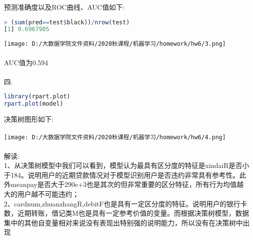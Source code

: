 \documentclass[]{article}
\begin{document}
预测准确度以及ROC曲线、AUC值如下:
\begin{lstlisting}[language=R]
> (sum(pred==test$black))/nrow(test)
[1] 0.6967905
\end{lstlisting}
\texttt{[image: D:/大数据学院文件资料/2020秋课程/机器学习/homework/hw6/3.png]}\\\\
AUC值为0.594\\\\
四.
\begin{lstlisting}[language=R]
library(rpart.plot)
rpart.plot(model)
\end{lstlisting}
决策树图形如下:\\\\
\texttt{[image: D:/大数据学院文件资料/2020秋课程/机器学习/homework/hw6/4.png]}\\\\
解读:\\
1、从决策树模型中我们可以看到，模型认为最具有区分度的特征是xindaiR是否小于184。说明用户的近期贷款情况对于模型识别用户是否违约非常具有参考性。此外meanpay是否大于290e+3也是其次的但非常重要的区分特征，所有行为均值越大的用户越不可能违约；\\
2、cardnum,zhuanzhangR,debitF也是具有一定区分度的特征。说明用户的银行卡数，近期转账，借记类M也是具有一定参考价值的变量。而根据决策树模型，数据集中的其他自变量相对来说没有表现出特别强的说明能力，所以没有在决策树中出现
\end{document}
